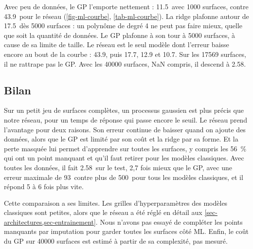 Avec peu de données, le GP l'emporte nettement : \num{11.5}\pb\ avec \num{1000} surfaces, contre \num{43.9}\pb\
pour le réseau (\cref{fig-ml-courbe}, \cref{tab-ml-courbe}). La ridge plafonne autour de \num{17.5}\pb\ dès
\num{5000} surfaces : un polynôme de degré 4 ne peut pas faire mieux, quelle que soit la quantité de données. Le GP
plafonne à son tour à \num{5000} surfaces, à cause de sa limite de taille. Le réseau est le seul modèle dont
l'erreur baisse encore au bout de la courbe : \num{43.9}, puis \num{17.7}, \num{12.9} et \num{10.7}\pb. Sur les
\num{17569} surfaces, il ne rattrape pas le GP. Avec les \num{40000} surfaces, NaN compris, il descend à
\num{2.58}\pb.

\subsection{Bilan}
\label{sec-ml-bilan}

Sur un petit jeu de surfaces complètes, un processus gaussien est plus précis que notre réseau, pour un temps de
réponse qui passe encore le seuil. Le réseau prend l'avantage pour deux raisons. Son erreur continue de baisser
quand on ajoute des données, alors que le GP est limité par son coût et la ridge par sa forme. Et la perte masquée
lui permet d'apprendre sur toutes les surfaces, y compris les \SI{56}{\percent} qui ont un point manquant et qu'il
faut retirer pour les modèles classiques. Avec toutes les données, il fait \num{2.58}\pb\ sur le test, 2,7 fois
mieux que le GP, avec une erreur maximale de \num{93}\pb\ contre plus de \num{500}\pb\ pour tous les modèles
classiques, et il répond 5 à 6 fois plus vite.

Cette comparaison a ses limites. Les grilles d'hyperparamètres des modèles classiques sont petites, alors que le
réseau a été réglé en détail aux \cref{sec-architectures,sec-entrainement}. Nous n'avons pas essayé de compléter
les points manquants par imputation pour garder toutes les surfaces côté ML. Enfin, le coût du GP sur
\num{40000} surfaces est estimé à partir de sa complexité, pas mesuré.
